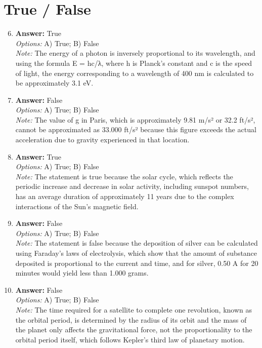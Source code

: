 \documentclass[12pt]{article}
\begin{document}
\section*{True / False}
\begin{enumerate}[label=\arabic*.]
\setcounter{enumi}{5}
\item \textbf{Answer:} True
\\ \textit{Options:} A) True; B) False
\\ \textit{Note:} The energy of a photon is inversely proportional to its wavelength, and using the formula E = hc/λ, where h is Planck's constant and c is the speed of light, the energy corresponding to a wavelength of 400 nm is calculated to be approximately 3.1 eV.
\item \textbf{Answer:} False
\\ \textit{Options:} A) True; B) False
\\ \textit{Note:} The value of g in Paris, which is approximately 9.81 m/s² or 32.2 ft/s², cannot be approximated as 33.000 ft/s² because this figure exceeds the actual acceleration due to gravity experienced in that location.
\item \textbf{Answer:} True
\\ \textit{Options:} A) True; B) False
\\ \textit{Note:} The statement is true because the solar cycle, which reflects the periodic increase and decrease in solar activity, including sunspot numbers, has an average duration of approximately 11 years due to the complex interactions of the Sun's magnetic field.
\item \textbf{Answer:} False
\\ \textit{Options:} A) True; B) False
\\ \textit{Note:} The statement is false because the deposition of silver can be calculated using Faraday's laws of electrolysis, which show that the amount of substance deposited is proportional to the current and time, and for silver, 0.50 A for 20 minutes would yield less than 1.000 grams.
\item \textbf{Answer:} False
\\ \textit{Options:} A) True; B) False
\\ \textit{Note:} The time required for a satellite to complete one revolution, known as the orbital period, is determined by the radius of its orbit and the mass of the planet only affects the gravitational force, not the proportionality to the orbital period itself, which follows Kepler's third law of planetary motion.
\end{enumerate}
\end{document}
